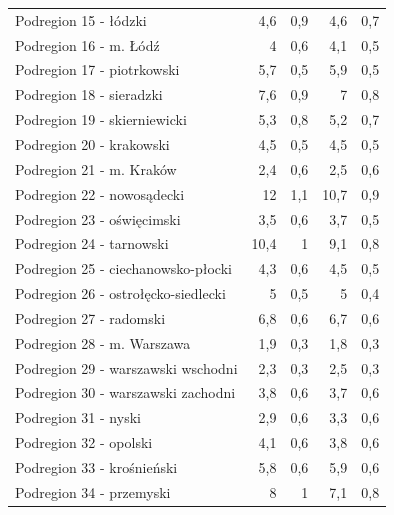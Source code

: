 \begin{center}
\begin{longtable}{p{6cm}rrrr}
Podregion 15 - łódzki                    & 4,6     & 0,9         & 4,6      & 0,7          \\
Podregion 16 - m. Łódź                   & 4       & 0,6         & 4,1      & 0,5          \\
Podregion 17 - piotrkowski               & 5,7     & 0,5         & 5,9      & 0,5          \\
Podregion 18 - sieradzki                 & 7,6     & 0,9         & 7        & 0,8          \\
Podregion 19 - skierniewicki             & 5,3     & 0,8         & 5,2      & 0,7          \\
Podregion 20 - krakowski                 & 4,5     & 0,5         & 4,5      & 0,5          \\
Podregion 21 - m. Kraków                 & 2,4     & 0,6         & 2,5      & 0,6          \\
Podregion 22 - nowosądecki               & 12      & 1,1         & 10,7     & 0,9          \\
Podregion 23 - oświęcimski               & 3,5     & 0,6         & 3,7      & 0,5          \\
Podregion 24 - tarnowski                 & 10,4    & 1           & 9,1      & 0,8          \\
Podregion 25 - ciechanowsko-płocki       & 4,3     & 0,6         & 4,5      & 0,5          \\
Podregion 26 - ostrołęcko-siedlecki      & 5       & 0,5         & 5        & 0,4          \\
Podregion 27 - radomski                  & 6,8     & 0,6         & 6,7      & 0,6          \\
Podregion 28 - m. Warszawa               & 1,9     & 0,3         & 1,8      & 0,3          \\
Podregion 29 - warszawski wschodni       & 2,3     & 0,3         & 2,5      & 0,3          \\
Podregion 30 - warszawski zachodni       & 3,8     & 0,6         & 3,7      & 0,6          \\
Podregion 31 - nyski                     & 2,9     & 0,6         & 3,3      & 0,6          \\
Podregion 32 - opolski                   & 4,1     & 0,6         & 3,8      & 0,6          \\
Podregion 33 - krośnieński               & 5,8     & 0,6         & 5,9      & 0,6          \\
Podregion 34 - przemyski                 & 8       & 1           & 7,1      & 0,8          \\

\end{longtable}
\end{center}

